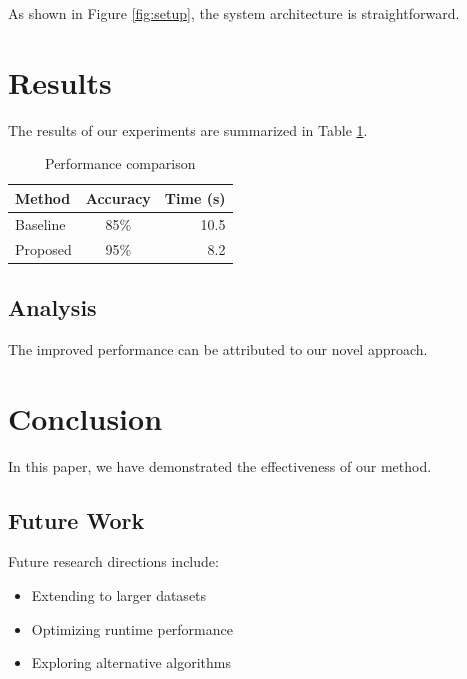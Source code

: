 \documentclass{article}
\begin{document}
As shown in Figure \ref{fig:setup}, the system architecture is straightforward.

\section{Results}

The results of our experiments are summarized in Table \ref{tab:results}.

\begin{table}
\centering
\begin{tabular}{|l|c|r|}
\hline
Method & Accuracy & Time (s) \\
\hline
Baseline & 85\% & 10.5 \\
Proposed & 95\% & 8.2 \\
\hline
\end{tabular}
\caption{Performance comparison}
\label{tab:results}
\end{table}

\subsection{Analysis}

The improved performance can be attributed to our novel approach.

\section{Conclusion}

In this paper, we have demonstrated the effectiveness of our method.

\subsection{Future Work}

Future research directions include:
\begin{itemize}
\item Extending to larger datasets
\item Optimizing runtime performance
\item Exploring alternative algorithms
\end{itemize}
\end{document}
